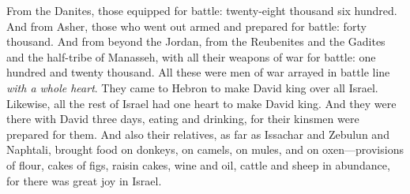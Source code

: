 \begin{biblechapter}
\verse From the Danites, those equipped for battle: twenty-eight thousand six hundred.
\verse And from Asher, those who went out armed and prepared for battle: forty thousand.
\verse And from beyond the Jordan, from the Reubenites and the Gadites and the half-tribe of Manasseh, with all their weapons of war for battle: one hundred and twenty thousand.
\verse All these were men of war arrayed in battle line \textit{with a whole heart}. They came to Hebron to make David king over all Israel. Likewise, all the rest of Israel had one heart to make David king.
\verse And they were there with David three days, eating and drinking, for their kinsmen were prepared for them.
\verse And also their relatives, as far as Issachar and Zebulun and Naphtali, brought food on donkeys, on camels, on mules, and on oxen—provisions of flour, cakes of figs, raisin cakes, wine and oil, cattle and sheep in abundance, for there was great joy in Israel.
\end{biblechapter}

